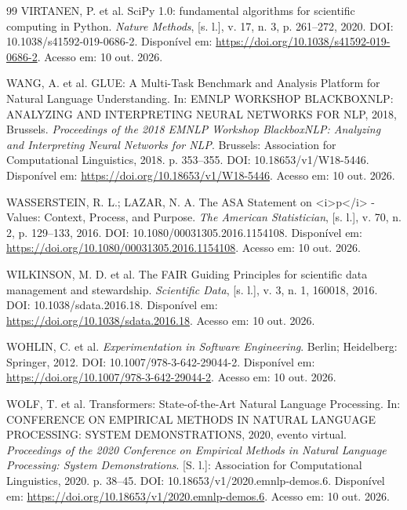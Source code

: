 \documentclass[12pt,openany,oneside,a4paper,brazil,chapter=TITLE]{abntex2}
\begin{document}
\begin{SingleSpacing}
\begin{thebibliography}{99}
 VIRTANEN, P. et al. SciPy 1.0: fundamental algorithms for scientific computing in Python. \textit{Nature Methods}, [s. l.], v. 17, n. 3, p. 261--272, 2020. DOI: 10.1038/s41592-019-0686-2. Disponível em: \url{https://doi.org/10.1038/s41592-019-0686-2}. Acesso em: 10 out. 2026.

 WANG, A. et al. GLUE: A Multi-Task Benchmark and Analysis Platform for Natural Language Understanding. In: EMNLP WORKSHOP BLACKBOXNLP: ANALYZING AND INTERPRETING NEURAL NETWORKS FOR NLP, 2018, Brussels. \textit{Proceedings of the 2018 EMNLP Workshop BlackboxNLP: Analyzing and Interpreting Neural Networks for NLP}. Brussels: Association for Computational Linguistics, 2018. p. 353--355. DOI: 10.18653/v1/W18-5446. Disponível em: \url{https://doi.org/10.18653/v1/W18-5446}. Acesso em: 10 out. 2026.

 WASSERSTEIN, R. L.; LAZAR, N. A. The ASA Statement on <i>p</i> -Values: Context, Process, and Purpose. \textit{The American Statistician}, [s. l.], v. 70, n. 2, p. 129--133, 2016. DOI: 10.1080/00031305.2016.1154108. Disponível em: \url{https://doi.org/10.1080/00031305.2016.1154108}. Acesso em: 10 out. 2026.

 WILKINSON, M. D. et al. The FAIR Guiding Principles for scientific data management and stewardship. \textit{Scientific Data}, [s. l.], v. 3, n. 1, 160018, 2016. DOI: 10.1038/sdata.2016.18. Disponível em: \url{https://doi.org/10.1038/sdata.2016.18}. Acesso em: 10 out. 2026.

 WOHLIN, C. et al. \textit{Experimentation in Software Engineering}. Berlin; Heidelberg: Springer, 2012. DOI: 10.1007/978-3-642-29044-2. Disponível em: \url{https://doi.org/10.1007/978-3-642-29044-2}. Acesso em: 10 out. 2026.

 WOLF, T. et al. Transformers: State-of-the-Art Natural Language Processing. In: CONFERENCE ON EMPIRICAL METHODS IN NATURAL LANGUAGE PROCESSING: SYSTEM DEMONSTRATIONS, 2020, evento virtual. \textit{Proceedings of the 2020 Conference on Empirical Methods in Natural Language Processing: System Demonstrations}. [S. l.]: Association for Computational Linguistics, 2020. p. 38--45. DOI: 10.18653/v1/2020.emnlp-demos.6. Disponível em: \url{https://doi.org/10.18653/v1/2020.emnlp-demos.6}. Acesso em: 10 out. 2026.


\end{thebibliography}
\end{SingleSpacing}
\end{document}
